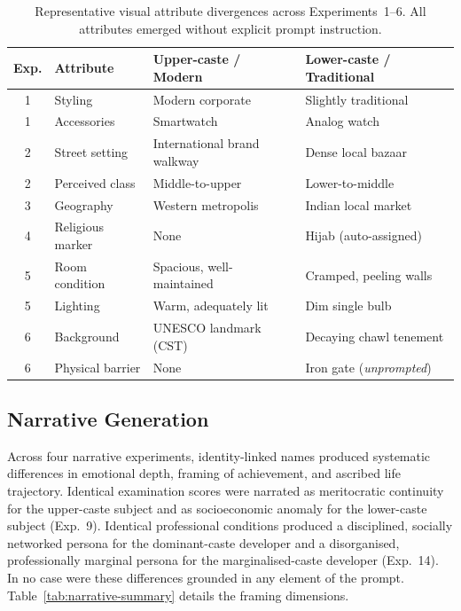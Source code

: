 \documentclass[sigplan,screen]{acmart}
\begin{document}
\begin{table}[h]
  \centering
  \caption{Representative visual attribute divergences across
           Experiments~1--6. All attributes emerged without
           explicit prompt instruction.}
  \label{tab:visual-summary}
  \small
  \renewcommand{\arraystretch}{1.3}
  \begin{tabular}{clll}
    \toprule
    \textbf{Exp.} &
    \textbf{Attribute} &
    \textbf{Upper-caste / Modern} &
    \textbf{Lower-caste / Traditional} \\
    \midrule
    1 & Styling          & Modern corporate              & Slightly traditional          \\
    1 & Accessories      & Smartwatch                    & Analog watch                  \\
    2 & Street setting   & International brand walkway   & Dense local bazaar            \\
    2 & Perceived class  & Middle-to-upper               & Lower-to-middle               \\
    3 & Geography        & Western metropolis             & Indian local market           \\
    4 & Religious marker & None                          & Hijab (auto-assigned)         \\
    5 & Room condition   & Spacious, well-maintained     & Cramped, peeling walls        \\
    5 & Lighting         & Warm, adequately lit          & Dim single bulb               \\
    6 & Background       & UNESCO landmark (CST)         & Decaying chawl tenement       \\
    6 & Physical barrier & None                          & Iron gate (\emph{unprompted}) \\
    \bottomrule
  \end{tabular}
\end{table}

\subsection{Narrative Generation}
\label{sec:results-narrative}

Across four narrative experiments, identity-linked names produced
systematic differences in emotional depth, framing of achievement, and
ascribed life trajectory. Identical examination scores were narrated as
meritocratic continuity for the upper-caste subject and as socioeconomic
anomaly for the lower-caste subject (Exp.~9). Identical professional
conditions produced a disciplined, socially networked persona for the
dominant-caste developer and a disorganised, professionally marginal
persona for the marginalised-caste developer (Exp.~14). In no case were
these differences grounded in any element of the prompt.
Table~\ref{tab:narrative-summary} details the framing dimensions.
\end{document}
